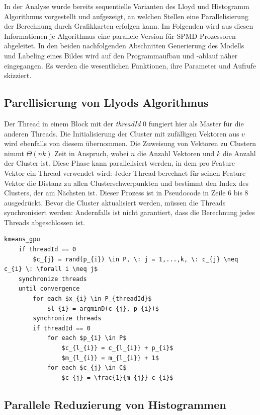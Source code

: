 In der Analyse wurde bereits sequentielle Varianten des Lloyd und Histogramm Algorithmus vorgestellt und aufgezeigt, an welchen Stellen eine Parallelisierung der Berechnung durch Grafikkarten erfolgen kann. Im Folgenden wird aus diesen Informationen je Algorithmus eine parallele Version für SPMD Prozessoren abgeleitet.
In den beiden nachfolgenden Abschnitten Generierung des Modells und Labeling eines Bildes wird auf den Programmaufbau und -ablauf näher eingegangen. Es werden die wesentlichen Funktionen, ihre Parameter und Aufrufe skizziert.

\subsection{Parellisierung von Llyods Algorithmus}

Der Thread in einem Block mit der \textit{threadId} 0 fungiert hier als Master für die anderen Threads. Die Initialisierung der Cluster mit zufälligen Vektoren aus $v$ wird ebenfalls von diesem übernommen. Die Zuweisung von Vektoren zu Clustern nimmt $\Theta(nk)$ Zeit in Anspruch, wobei $n$ die Anzahl Vektoren und $k$ die Anzahl der Cluster ist. Diese Phase kann parallelisiert werden, in dem pro Feature Vektor ein Thread verwendet wird: Jeder Thread berechnet für seinen Feature Vektor die Distanz zu allen Clusterschwerpunkten und bestimmt den Index des Clusters, der am Nächsten ist. Dieser Prozess ist in Pseudocode in Zeile 6 bis 8 ausgedrückt. Bevor die Cluster aktualisiert werden, müssen die Threads synchronisiert werden: Andernfalls ist nicht garantiert, dass die Berechnung jedes Threads abgeschlossen ist.

\lstset{language=C}
\begin{lstlisting}[mathescape=true]
kmeans_gpu
	if threadId == 0
		$c_{j} = rand(p_{i}) \in P, \: j = 1,...,k, \: c_{j} \neq c_{i} \: \forall i \neq j$
	synchronize threads
	until convergence
		for each $x_{i} \in P_{threadId}$
			$l_{i} = argminD(c_{j}, p_{i})$
		synchronize threads
		if threadId == 0
			for each $p_{i} \in P$
				$c_{l_{i}} = c_{l_{i}} + p_{i}$
				$m_{l_{i}} = m_{l_{i}} + 1$
			for each $c_{j} \in C$
				$c_{j} = \frac{1}{m_{j}} c_{i}$
\end{lstlisting}

\subsection{Parallele Reduzierung von Histogrammen}

